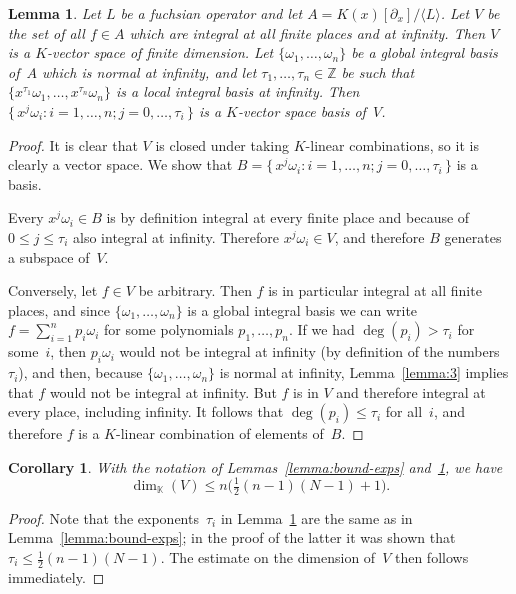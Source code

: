 \documentclass{sig-alternate}
\newtheorem{corollary}[theorem]{Corollary}
\newtheorem{lemma}[theorem]{Lemma}
\def\<#1>{\langle#1\rangle}
\let\set\mathbb
\begin{document}
\begin{lemma}\label{lemma:nopoles-space}
  Let $L$ be a fuchsian operator and let $A=K(x)[\partial_x]/\<L>$.
  Let $V$ be the set of all $f\in A$ which are integral at all finite places and at infinity.
  Then $V$ is a $K$-vector space of finite dimension.
  Let $\{\omega_1,\dots,\omega_n\}$ be a global integral basis of~$A$ which is normal at infinity,
  and let $\tau_1,\dots,\tau_n\in\set Z$ be such that $\{x^{\tau_1}\omega_1,\dots,x^{\tau_n}\omega_n\}$ is
  a local integral basis at infinity.
  Then $\{\,x^j\omega_i : i=1,\dots,n; j=0,\dots,\tau_i\,\}$ is a $K$-vector space basis of~$V$.
\end{lemma}
\begin{proof}
  It is clear that $V$ is closed under taking $K$-linear combinations, so it is clearly a vector space.
  We show that $B=\{\,x^j\omega_i : i=1,\dots,n; j=0,\dots,\tau_i\,\}$ is a basis.

  Every $x^j\omega_i\in B$ is by definition integral at every finite place and because of $0\leq j\leq \tau_i$ also
  integral at infinity. Therefore $x^j\omega_i\in V$, and therefore $B$ generates a subspace of~$V$.

  Conversely, let $f\in V$ be arbitrary. Then $f$ is in particular integral at all finite places,
  and since $\{\omega_1,\dots,\omega_n\}$ is a global integral basis we can write $f=\sum_{i=1}^n p_i\omega_i$
  for some polynomials $p_1,\dots,p_n$.
  If we had $\deg(p_i)>\tau_i$ for some~$i$, then $p_i\omega_i$ would not be integral at infinity
  (by definition of the numbers~$\tau_i$), and then, because $\{\omega_1,\dots,\omega_n\}$ is normal
  at infinity, Lemma~\ref{lemma:3} implies that $f$ would not be integral at infinity.
  But $f$ is in $V$ and therefore integral at every place, including infinity.
  It follows that $\deg(p_i)\leq \tau_i$ for all~$i$, and therefore $f$ is a $K$-linear combination
  of elements of~$B$.
\end{proof}

\begin{corollary}
With the notation of Lemmas~\ref{lemma:bound-exps}
and~\ref{lemma:nopoles-space}, we have
\[
  \dim_{\set K}(V)\leq n\bigl(\tfrac12(n-1)(N-1)+1\bigr).
\]
\end{corollary}
\begin{proof}
Note that the exponents~$\tau_i$ in Lemma~\ref{lemma:nopoles-space} are the
same as in Lemma~\ref{lemma:bound-exps}; in the proof of the latter it was
shown that $\tau_i\leq\frac12(n-1)(N-1)$. The estimate on the dimension of~$V$
then follows immediately.
\end{proof}
\end{document}
